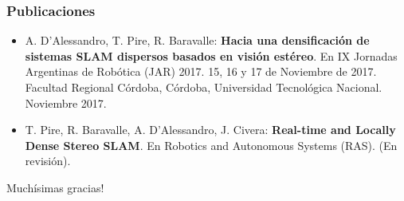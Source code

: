\documentclass[compress]{beamer}
\begin{document}
\begin{frame}
    \frametitle{Publicaciones}

	\begin{itemize}
		\item A. D'Alessandro, T. Pire, R. Baravalle: \textbf{Hacia una densificación de sistemas SLAM dispersos basados en visión estéreo}. En IX Jornadas Argentinas de Robótica (JAR) 2017. 15, 16 y 17 de Noviembre de 2017. Facultad Regional Córdoba, Córdoba, Universidad Tecnológica Nacional. Noviembre 2017.
		\vspace{1em}
		\item T. Pire, R. Baravalle, A. D'Alessandro, J. Civera: \textbf{Real-time and Locally Dense Stereo SLAM}. En Robotics and Autonomous Systems (RAS). (En revisión).
	\end{itemize}
    
\end{frame}


\begin{frame}
	\centering
	\Large{Muchísimas gracias!}	
	\\
	\vspace{2cm}
\end{frame}
\end{document}
